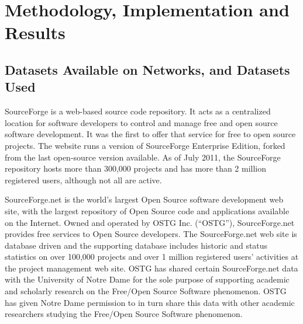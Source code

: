 \chapter{Methodology, Implementation and Results}


\section{Datasets Available on Networks, and Datasets Used}


SourceForge is a web-based source code repository. It acts as a centralized location for software developers
to control and manage free and open source software development. It was the first to offer that service for
free to open source projects. The website runs a version of SourceForge Enterprise Edition, forked from the
last open-source version available. As of July 2011, the SourceForge repository hosts more than 300,000 projects
and has more than 2 million registered users, although not all are active.


SourceForge.net is the world’s largest Open Source software development web site, with the largest repository
of Open Source code and applications available on the Internet. Owned and operated by OSTG Inc. (``OSTG''),
SourceForge.net provides free services to Open Source developers. The SourceForge.net web site is database
driven and the supporting database includes historic and status statistics on over 100,000 projects and
over 1 million registered users’ activities at the project management web site. OSTG has shared certain
SourceForge.net data with the University of Notre Dame for the sole purpose of supporting academic and
scholarly research on the Free/Open Source Software phenomenon. OSTG has given Notre Dame permission to
in turn share this data with other academic researchers studying the Free/Open Source Software phenomenon.


